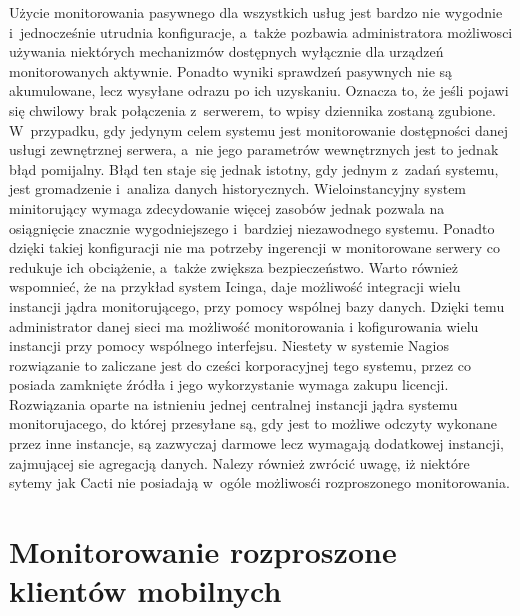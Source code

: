 
Użycie monitorowania pasywnego dla wszystkich usług jest bardzo nie
wygodnie i~jednocześnie utrudnia konfiguracje, a~także pozbawia
administratora możliwosci używania niektórych mechanizmów dostępnych
wyłącznie dla urządzeń monitorowanych aktywnie. Ponadto wyniki
sprawdzeń pasywnych nie są akumulowane, lecz wysyłane odrazu po ich
uzyskaniu. Oznacza to, że jeśli pojawi się chwilowy brak połączenia
z~serwerem, to wpisy dziennika zostaną zgubione. W~przypadku, gdy
jedynym celem systemu jest monitorowanie dostępności danej usługi
zewnętrznej serwera, a~nie jego parametrów wewnętrznych jest to jednak
błąd pomijalny. Błąd ten staje się jednak istotny, gdy jednym z~zadań
systemu, jest gromadzenie i~analiza danych
historycznych. Wieloinstancyjny system minitorujący wymaga
zdecydowanie więcej zasobów jednak pozwala na osiągnięcie znacznie
wygodniejszego i~bardziej niezawodnego systemu. Ponadto dzięki takiej
konfiguracji nie ma potrzeby ingerencji w monitorowane serwery co
redukuje ich obciążenie, a~także zwiększa bezpieczeństwo. Warto
również wspomnieć, że na przykład system Icinga, daje możliwość
integracji wielu instancji jądra monitorującego, przy pomocy wspólnej
bazy danych. Dzięki temu administrator danej sieci ma możliwość
monitorowania i kofigurowania wielu instancji przy pomocy wspólnego
interfejsu. Niestety w systemie Nagios rozwiązanie to zaliczane jest
do cześci korporacyjnej tego systemu, przez co posiada zamknięte
źródła i jego wykorzystanie wymaga zakupu licencji. Rozwiązania oparte
na istnieniu jednej centralnej instancji jądra systemu monitorujacego,
do której przesyłane są, gdy jest to możliwe odczyty wykonane przez
inne instancje, są zazwyczaj darmowe lecz wymagają dodatkowej
instancji, zajmującej sie agregacją danych. Nalezy również zwrócić
uwagę, iż niektóre sytemy jak Cacti nie posiadają w~ogóle możliwosći
rozproszonego monitorowania.

\section[Monitorowanie rozproszone][Monitorowanie rozproszone klientów
mobilnych]{Monitorowanie rozproszone klientów mobilnych}


